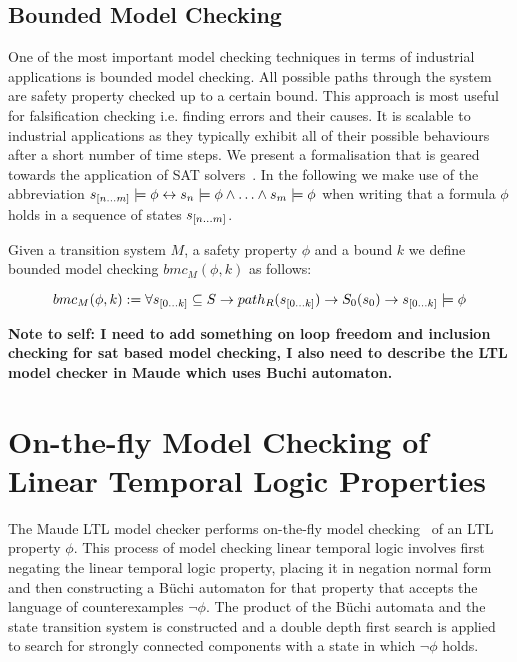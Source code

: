 \subsection*{Bounded Model Checking}
One of the most important model checking techniques in terms of industrial applications is bounded model checking. All possible paths through the system are safety property checked up to a certain bound. This approach is most useful for falsification checking i.e. finding errors and their causes. It is scalable to industrial applications as they typically exhibit all of their possible behaviours after a short number of time steps. We present a formalisation that is geared towards the application of SAT solvers~\cite{EC01}. In the following we make use of the abbreviation $s_{{[}n \ldots m {]}} \models \phi \leftrightarrow s_n \models \phi \wedge \ldots \wedge  s_m \models \phi$ when writing that a formula $\phi$ holds in a sequence of states $s_{{[}n \ldots m {]}}$.
\medskip
\begin{mydef}
Given a transition system $M$, a safety property $\phi$ and a bound $k$ we define bounded model checking $bmc_M(\phi,k)$ as follows:

$$bmc_M(\phi,k):= \forall s_{{[}0 \ldots k {]}} \subseteq S \to  path_R(s_{{[}0 \ldots k {]}}) \to S_0(s_0) \to s_{{[}0 \ldots k {]}} \models \phi$$
\end{mydef}
\medskip
\textbf{Note to self: I need to add something on loop freedom and inclusion checking for sat based model checking, I also need to describe the LTL model checker in Maude which uses Buchi automaton.}  

\section{On-the-fly Model Checking of Linear Temporal Logic Properties}
The Maude LTL model checker performs on-the-fly model checking~\cite{CC91} of an LTL property $\phi$.
This process of model checking linear temporal logic involves first  negating the linear temporal  logic property, placing it in negation normal form and then constructing a B{\"u}chi automaton for that property that accepts the language of counterexamples $\neg \phi$. The product of the B{\"u}chi automata and the state transition system is constructed and a double depth first search is applied to search for strongly connected components with a state in which $\neg \phi$ holds.

